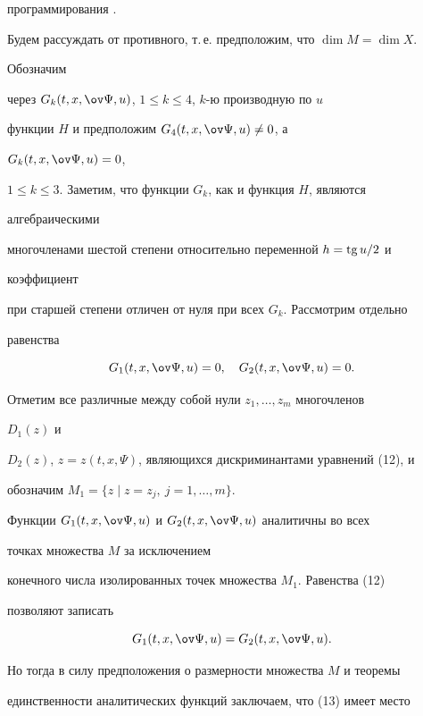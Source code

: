 программирования \cite{4}.





Будем рассуждать от противного, т.\,е. предположим, что $\dim M=\dim X$.


Обозначим


через $G_k(t,x,\ov\Psi,u)$, $1\le k\le 4$, $k$-ю производную по $u$


функции $H$ и предположим $G_4(t,x,\ov\Psi,u)\ne 0$, а


$G_k(t,x,\ov\Psi,u)=0$,


$1\le k\le 3$. Заметим, что функции $G_k$, как и функция $H$, являются


алгебраическими


многочленами шестой степени относительно переменной $h=\operatorname{tg} u/2$ и


коэффициент


при старшей степени отличен от нуля при всех $G_k$. Рассмотрим отдельно


равенства


\begin{equation}


G_1(t,x,\ov\Psi,u)=0,\quad G_2(t,x,\ov\Psi,u)=0.


\end{equation}


Отметим все различные между собой нули $z_1,\dotsc,z_m$ многочленов


$D_1(z)$ и


$D_2(z)$, $z=z(t,x,\Psi)$, являющихся дискриминантами уравнений (12), и


обозначим $M_1=\{z\mid z=z_j,\ j=1,\dotsc,m\}$.





Функции $G_1(t,x,\ov\Psi,u)$ и $G_2(t,x,\ov\Psi, u)$ аналитичны во всех


точках множества $M$ за исключением


конечного числа изолированных точек множества $M_1$. Равенства (12)


позволяют записать


\begin{equation}


G_1(t,x,\ov\Psi,u)=G_2(t,x,\ov\Psi,u).


\end{equation}


Но тогда в силу предположения о размерности множества $M$ и теоремы


единственности аналитических функций заключаем, что (13) имеет место



